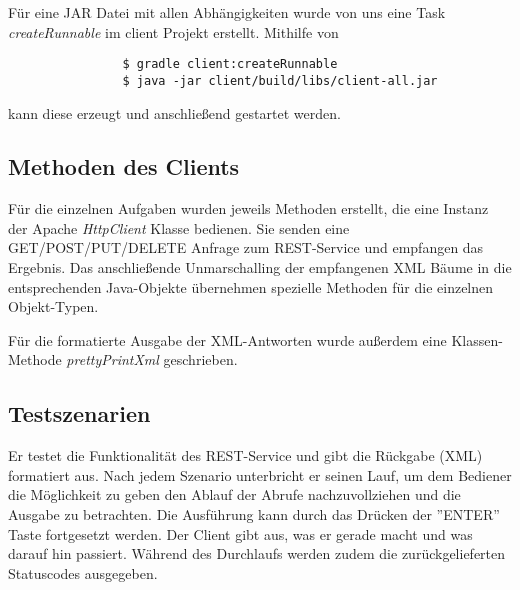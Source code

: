 \documentclass[12pt]{scrartcl}
\begin{document}
			Für eine JAR Datei mit allen Abhängigkeiten wurde von uns eine Task \emph{createRunnable} im client Projekt erstellt. Mithilfe von
			\begin{verbatim}
				$ gradle client:createRunnable
				$ java -jar client/build/libs/client-all.jar
			\end{verbatim}
			
			kann diese erzeugt und anschließend gestartet werden.
		\subsection{Methoden des Clients}
		
			Für die einzelnen Aufgaben wurden jeweils Methoden erstellt, die eine Instanz der Apache \emph{HttpClient} Klasse bedienen. Sie senden eine GET/POST/PUT/DELETE Anfrage zum REST-Service und empfangen das Ergebnis. Das anschließende Unmarschalling der empfangenen XML Bäume in die entsprechenden Java-Objekte übernehmen spezielle Methoden für die einzelnen Objekt-Typen.
			
			Für die formatierte Ausgabe der XML-Antworten wurde außerdem eine Klassen-Methode \emph{prettyPrintXml} geschrieben.
		
		
		\subsection{Testszenarien}
			
			Er testet die Funktionalität des REST-Service und gibt die Rückgabe (XML) formatiert aus. Nach jedem Szenario unterbricht er seinen Lauf, um dem Bediener die Möglichkeit zu geben den Ablauf der Abrufe nachzuvollziehen und die Ausgabe zu betrachten. Die Ausführung kann durch das Drücken der ''ENTER'' Taste fortgesetzt werden. Der Client gibt aus, was er gerade macht und was darauf hin passiert. Während des Durchlaufs werden zudem die zurückgelieferten Statuscodes ausgegeben.
			
\end{document}
